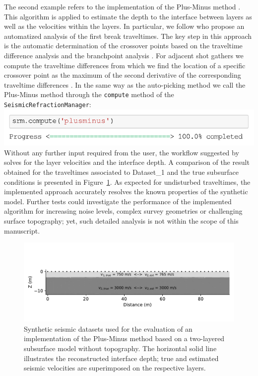 \documentclass[a4paper,fleqn]{cas-sc}
\begin{document}
The second example refers to the implementation of the Plus-Minus method \citep{hagedoorn1959}. This algorithm is applied to estimate the depth to the interface between layers as well as the velocities within the layers.
In particular, we follow \citet{dufour1996} who propose an automatized analysis of the first break traveltimes. The key step in this approach is the automatic determination of the crossover points based on the traveltime difference analysis \citep{lawton1989} and the branchpoint analysis \citep{wang1995}. For adjacent shot gathers we compute the traveltime differences from which we find the location of a specific crossover point as the maximum of the second derivative of the corresponding traveltime differences \citep{dufour1996}. In the same way as the auto-picking method we call the Plus-Minus method through the \texttt{compute} method of the \texttt{SeismicRefractionManager}:
\newline
\includegraphics[width=.5\textwidth]{./figures/plusminus.pdf}
\newline
Without any further input required from the user, the workflow suggested by \citep{dufour1996} solves for the layer velocities and the interface depth. A comparison of the result obtained for the traveltimes associated to Dataset\_1 and the true subsurface conditions is presented in Figure~\ref{fig:pmmethod}. As expected for undisturbed traveltimes, the implemented approach accurately resolves the known properties of the synthetic model. Further tests could investigate the performance of the implemented algorithm for increasing noise levels, complex survey geometries or challenging surface topography; yet, such detailed analysis is not within the scope of this manuscript.
\begin{figure}
	\centering
	\includegraphics[width=.75\textwidth]{./figures/pmmethod_result.pdf}
	\caption{Synthetic seismic datasets used for the evaluation of an implementation of the Plus-Minus method \citep{hagedoorn1959} based on a two-layered subsurface model without topography. The horizontal solid line illustrates the reconstructed interface depth; true and estimated seismic velocities are superimposed on the respective layers.}
	\label{fig:pmmethod}
\end{figure}
\end{document}
